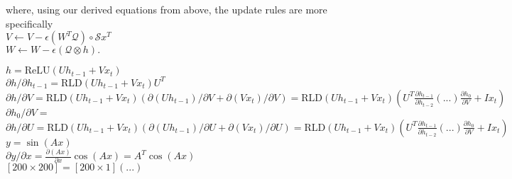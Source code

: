 \documentclass[landscape]{report}
\newcommand{\tab}{\-\hspace{0.5cm}}
\newcommand{\ReLU}{\text{ReLU}}
\begin{document}
where, using our derived equations from above, the update rules are more specifically\\
\tab \tab \tab \tab $V \leftarrow V - \epsilon(W^T \mathcal{Q}) \circ \mathcal{S} x^T $\\
\tab \tab \tab \tab $ W \leftarrow W - \epsilon(\mathcal{Q} \otimes h). $

$ h = \ReLU(Uh_{t-1} + V x_t)$\\
$ \partial h/ \partial h_{t-1} = \text{RLD}(Uh_{t-1} + V x_t)U^T $\\
$ \partial h/ \partial V = \text{RLD}(Uh_{t-1} + V x_t)(\partial (U h_{t-1})/ \partial V + \partial (Vx_t)/ \partial V )= \text{RLD}(Uh_{t-1} + V x_t)(U^T\frac{\partial h_{t-1}}{\partial h_{t-2}}(...)\frac{\partial h_{0}}{\partial V} + I x_t  ) $\\
$\partial h_0/ \partial V = $\\
$ \partial h/ \partial U = \text{RLD}(Uh_{t-1} + V x_t)(\partial (U h_{t-1})/ \partial U + \partial (Vx_t)/ \partial U )= \text{RLD}(Uh_{t-1} + V x_t)(U^T\frac{\partial h_{t-1}}{\partial h_{t-2}}(...)\frac{\partial h_{0}}{\partial V} + I x_t  ) $\\



$ y = \sin(Ax)$\\
$ \partial y/\partial x = \frac{\partial (Ax)}{\partial x}\cos(Ax) = A^T \cos(Ax) $\\
$[200\times200] = [200\times1] (...)$
\end{document}

